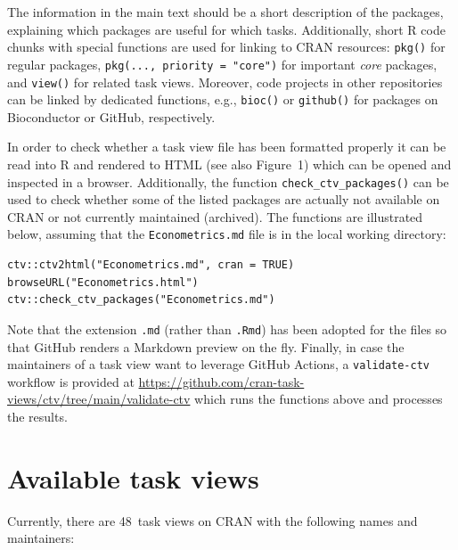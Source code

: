 The information in the main text should be a short description of the packages,
explaining which packages are useful for which tasks. Additionally, short R code
chunks with special functions are used for linking to CRAN resources:
\texttt{pkg()} for regular packages, \texttt{pkg(...,\ priority\ =\ "core")} for important \emph{core}
packages, and \texttt{view()} for related task views. Moreover, code projects in other
repositories can be linked by dedicated functions, e.g., \texttt{bioc()} or
\texttt{github()} for packages on Bioconductor or GitHub, respectively.

In order to check whether a task view file has been formatted properly it can be read into
R and rendered to HTML (see also Figure~1) which can be opened and inspected in a browser. Additionally,
the function \texttt{check\_ctv\_packages()} can be used to check whether some of the listed
packages are actually not available on CRAN or not currently maintained
(archived). The functions are illustrated below, assuming that the \texttt{Econometrics.md}
file is in the local working directory:

\begin{verbatim}
ctv::ctv2html("Econometrics.md", cran = TRUE)
browseURL("Econometrics.html")
ctv::check_ctv_packages("Econometrics.md")
\end{verbatim}

Note that the extension \texttt{.md} (rather than \texttt{.Rmd}) has been adopted for the files
so that GitHub renders a Markdown preview on the fly. Finally, in case the maintainers
of a task view want to leverage GitHub Actions, a \texttt{validate-ctv} workflow is
provided at \url{https://github.com/cran-task-views/ctv/tree/main/validate-ctv} which
runs the functions above and processes the results.

\section{Available task views}\label{available-task-views}

Currently, there are 48~task views on CRAN with the following names
and maintainers:

